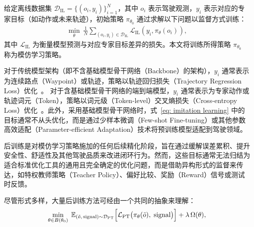 \documentclass[runningheads]{llncs}
\begin{document}
\vspace{0.5em}
给定离线数据集 \(\mathcal{D}_{\text{IL}}=\{(o_i,y_i)\}_{i=1}^{N}\)，其中 \(o_i\) 表示驾驶观测，\(y_i\) 表示对应的专家目标（如动作或未来轨迹），初始策略 \(\pi_{\theta_0}\) 通过求解以下问题以监督方式训练：
\vspace{-0.3em}
\begin{align}
\label{eq: imitation learning}    
\min_{\theta}~ \frac{1}{N} \sum_{(o_i, y_i)\in \mathcal{D}_{\text{IL}}} \mathcal{L}_{\mathrm{IL}}(y_i,\pi_\theta(o_i)),
\end{align} 
\baselineskip 
\noindent 
其中 $\mathcal{L}_{\mathrm{IL}}$ 为衡量模型预测与对应专家目标差异的损失。本文将训练所得策略 \(\pi_{\theta_0}\) 称为模仿学习策略。


对于传统模型架构（即不含基础模型骨干网络（Backbone）的架构），\(y_i\) 通常表示为连续路点（Waypoint）或轨迹，策略以轨迹回归损失（Trajectory Regression Loss）优化~\cite{zheng2025diffusion,liao2025diffusiondrive}。
对于含基础模型骨干网络的端到端模型，\(y_i\) 通常表示为专家动作或轨迹词元（Token），策略以词元级（Token-level）交叉熵损失（Cross-entropy Loss）优化~\cite{mao2023gpt,hwang2024emma,autovla2025}。此外，采用基础模型骨干网络时，式~\eqref{eq: imitation learning} 中的目标通常不从头优化，而是通过少样本微调（Few-shot Fine-tuning）或其他参数高效适配（Parameter-efficient Adaptation）技术将预训练模型适配到驾驶领域。


\vspace{0.5em}
后训练是对模仿学习策略施加的任何后续精化阶段，旨在通过缓解误差累积、提升安全性、舒适性及其他驾驶品质来改进闭环行为。然而，这些目标通常无法归结为适合标准优化工具的通用且完全确定的优化问题，而是借助异构形式的监督来传达，如特权教师策略（Teacher Policy）、偏好比较、奖励（Reward）信号或测试时反馈。

尽管形式多样，大量后训练方法可经由一个共同的抽象来理解：
\vspace{-0.2em}
\begin{align}
\label{eq: 1-3 post-training}
   \min_{\theta \in B(\theta_0)}\; \mathbb{E}_{(\tilde{o},\,\text{signal}) \sim \mathcal{D}_{\text{PT}}}\Bigl[ \mathcal{L}_{\text{PT}}\bigl(\pi_\theta(\tilde{o}),\; \text{signal}\bigr) \Bigr] + \lambda\,\Omega(\theta),
\end{align}
\baselineskip 
\end{document}
